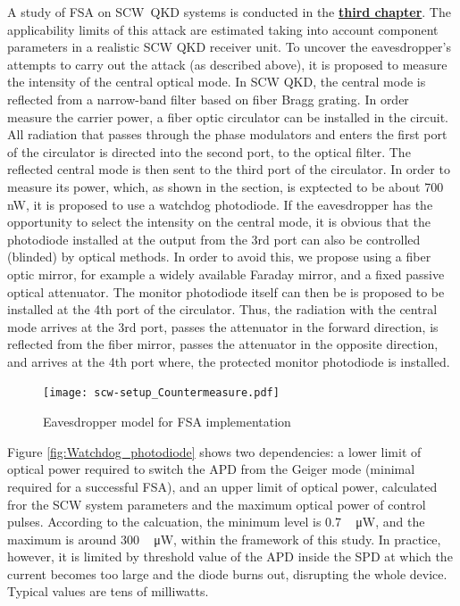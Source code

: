 A study of FSA on SCW~QKD systems is conducted in the \underline{\textbf{third chapter}}. The applicability limits of this attack are estimated taking into account component parameters in a realistic SCW QKD receiver unit. To uncover the eavesdropper's attempts to carry out the attack (as described above), it is proposed to measure the intensity of the central optical mode. In SCW QKD, the central mode is reflected from a narrow-band filter based on fiber Bragg grating. In order measure the carrier power, a fiber optic circulator can be installed in the circuit. All radiation that passes through the phase modulators and enters the first port of the circulator is directed into the second port, to the optical filter. The reflected central mode is then sent to the third port of the circulator. In order to measure its power, which, as shown in the section, is exptected to be about 700 ~ nW, it is proposed to use a watchdog photodiode. If the eavesdropper has the opportunity to select the intensity on the central mode, it is obvious that the photodiode installed at the output from the 3rd port can also be controlled (blinded) by optical methods. In order to avoid this, we propose using a fiber optic mirror, for example a widely available Faraday mirror, and a fixed passive optical attenuator. The monitor photodiode itself can then be is proposed to be installed at the 4th port of the circulator. Thus, the radiation with the central mode arrives at the 3rd port, passes the attenuator in the forward direction, is reflected from the fiber mirror, passes the attenuator in the opposite direction, and arrives at the 4th port where, the protected monitor photodiode is installed.       
 \begin{figure}[ht]
  \centering
  \texttt{[image: scw-setup\_Countermeasure.pdf]}
  \caption{Eavesdropper model for FSA implementation}
  \label{fig:countermeasure}
\end{figure}


Figure \ref{fig:Watchdog_photodiode} shows two dependencies: a lower limit of  optical power required to switch the APD from the Geiger mode (minimal required for a successful FSA), and an upper limit of optical power, calculated fror the SCW system parameters and the maximum optical power of control pulses. According to the calcuation, the minimum level is 0.7 ~ μW, and the maximum is around 300 ~ μW, within the framework of this study.  In practice, however, it is limited by threshold value of the APD inside the SPD at which the current becomes too large and the diode burns out, disrupting the whole device. Typical values are tens of milliwatts.
 
